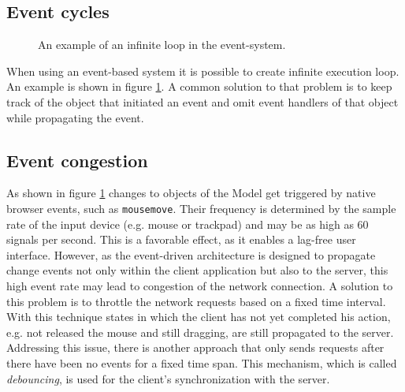 \subsection{Event cycles}

\begin{figure}
\begin{center}
\caption{An example of an infinite loop in the event-system.}
\label{fig:eventcycle}
\end{center}
\end{figure}

When using an event-based system it is possible to create infinite execution loop. An example is shown in figure \ref{fig:eventcycle}. A common solution to that problem is to keep track of the object that initiated an event and omit event handlers of that object while propagating the event. 

\subsection{Event congestion}
As shown in figure \ref{fig:eventcycle} changes to objects of the Model get triggered by native browser events, such as \texttt{mousemove}. Their frequency is determined by the sample rate of the input device (e.g. mouse or trackpad) and may be as high as 60 signals per second. This is a favorable effect, as it enables a lag-free user interface. However, as the event-driven architecture is designed to propagate change events not only within the client application but also to the server, this high event rate may lead to congestion of the network connection. 
A solution to this problem is to throttle the network requests based on a fixed time interval. With this technique states in which the client has not yet completed his action, e.g. not released the mouse and still dragging, are still propagated to the server. Addressing this issue, there is another approach that only sends requests after there have been no events for a fixed time span. This mechanism, which is called \textit{debouncing}, is used for the client's synchronization with the server.

